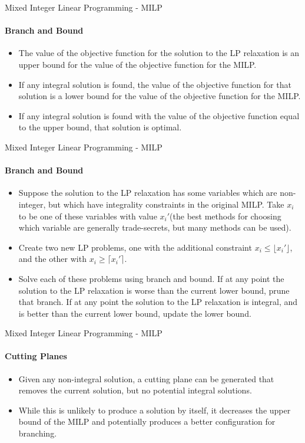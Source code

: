 \documentclass{beamer}
\begin{document}
	\begin{frame}{Mixed Integer Linear Programming - MILP}
		\framesubtitle{Branch and Bound}
		\begin{itemize}
			\item The value of the objective function for the solution to the LP relaxation is an upper bound for the value of the objective function for the MILP.
			\item If any integral solution is found, the value of the objective function for that solution is a lower bound for the value of the objective function for the MILP.
			\item If any integral solution is found with the value of the objective function equal to the upper bound, that solution is optimal.
		\end{itemize}
	\end{frame}

	\begin{frame}{Mixed Integer Linear Programming - MILP}
		\framesubtitle{Branch and Bound}
		\begin{itemize}
			\item Suppose the solution to the LP relaxation has some variables which are non-integer, but which have integrality constraints in the original MILP. Take $x_i$ to be one of these variables with value $x_i'$(the best methods for choosing which variable are generally trade-secrets, but many methods can be used). 
			\item Create two new LP problems, one with the additional constraint $x_i \leq \lfloor x_i'\rfloor$, and the other with $x_i\geq \lceil x_i'\rceil$.
			\item Solve each of these problems using branch and bound. If at any point the solution to the LP relaxation is worse than the current lower bound, prune that branch. If at any point the solution to the LP relaxation is integral, and is better than the current lower bound, update the lower bound.
		\end{itemize}
	\end{frame}
	
	\begin{frame}{Mixed Integer Linear Programming - MILP}
		\framesubtitle{Cutting Planes}
		\begin{itemize}
			\item Given any non-integral solution, a cutting plane can be generated that removes the current solution, but no potential integral solutions.
			\item While this is unlikely to produce a solution by itself, it decreases the upper bound of the MILP and potentially produces a better configuration for branching.
		\end{itemize}
	\end{frame}
	
\end{document}
